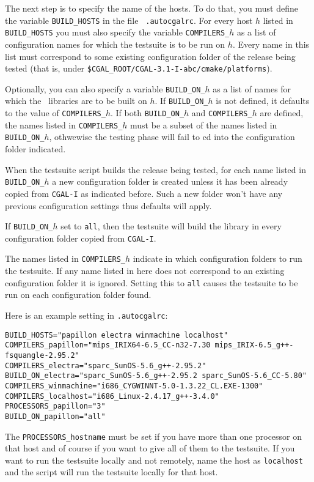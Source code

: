 The next step is to specify the name of the hosts. To do that, you
must define the variable \texttt{BUILD\_HOSTS} in the file {\tt
  .autocgalrc}. For every host $h$ listed in \texttt{BUILD\_HOSTS} you
must also specify the variable \texttt{COMPILERS\_$h$} as a list of
configuration names for which the testsuite is to be run on $h$. 
Every name in this list must correspond to some existing
configuration folder of the release being tested
(that is, under {\tt \$CGAL\_ROOT/CGAL-3.1-I-abc/cmake/platforms}).


Optionally, you can also specify a variable \texttt{BUILD\_ON\_$h$} as
a list of names for which the \cgal\ libraries are
to be built on $h$. If \texttt{BUILD\_ON\_$h$} is not defined, it
defaults to the value of \texttt{COMPILERS\_$h$}. If
both \texttt{BUILD\_ON\_$h$} and \texttt{COMPILERS\_$h$} are defined,
the names listed in \texttt{COMPILERS\_$h$} must be a subset of the names 
listed in \texttt{BUILD\_ON\_$h$}, othwewise the testing phase will fail
to cd into the configuration folder indicated.

When the testsuite script builds the release being tested, 
for each name listed in \texttt{BUILD\_ON\_$h$} a new configuration
folder is created unless it has been already copied from {\tt CGAL-I}
as indicated before. Such a new folder won't have any previous configuration
settings thus defaults will apply.

If \texttt{BUILD\_ON\_$h$} set to \texttt{all}, then
the testsuite will build the library in every configuration folder
copied from {\tt CGAL-I}.

The names listed in \texttt{COMPILERS\_$h$} indicate in which configuration folders
to run the testsuite. If any name listed in here does not correspond to an existing
configuration folder it is ignored. Setting this to \texttt{all} causes the
testsuite to be run on each configuration folder found.

\noindent Here is an example setting in {\tt .autocgalrc}:
\begingroup\small
\begin{verbatim}
BUILD_HOSTS="papillon electra winmachine localhost"
COMPILERS_papillon="mips_IRIX64-6.5_CC-n32-7.30 mips_IRIX-6.5_g++-fsquangle-2.95.2"
COMPILERS_electra="sparc_SunOS-5.6_g++-2.95.2"
BUILD_ON_electra="sparc_SunOS-5.6_g++-2.95.2 sparc_SunOS-5.6_CC-5.80"
COMPILERS_winmachine="i686_CYGWINNT-5.0-1.3.22_CL.EXE-1300"
COMPILERS_localhost="i686_Linux-2.4.17_g++-3.4.0"
PROCESSORS_papillon="3" 
BUILD_ON_papillon="all"
\end{verbatim}\endgroup
The {\tt PROCESSORS\_hostname} must be set if you have more
than one processor on that host and of course if you want to give all
of them to the testsuite. If you want to run the testsuite locally and
not remotely, name the host as {\tt localhost} and the script will run
the testsuite locally for that host.

